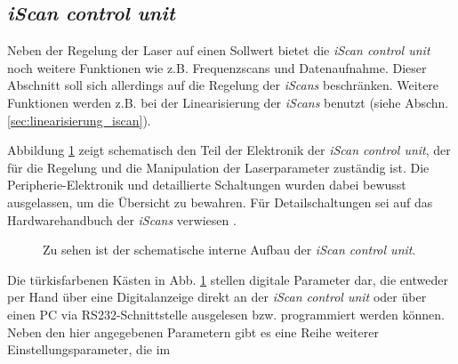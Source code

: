 \subsection{\textit{iScan control unit}}\label{subsec:iscan_control_unit}
Neben der Regelung der Laser auf einen Sollwert bietet die \textit{iScan control
unit} noch weitere Funktionen wie z.B. Frequenzscans und Datenaufnahme. Dieser
Abschnitt soll sich allerdings auf die Regelung der \textit{iScans} beschränken.
Weitere Funktionen werden z.B. bei der Linearisierung der \textit{iScans}
benutzt (siehe Abschn.
\ref{sec:linearisierung_iscan}).\par
Abbildung \ref{fig:iscan_control_unit_regelelektronik} zeigt schematisch den
Teil der Elektronik der \textit{iScan control unit}, der für die Regelung und
die Manipulation der Laserparameter zuständig ist. Die Peripherie-Elektronik und
detaillierte Schaltungen wurden dabei bewusst ausgelassen, um die Übersicht zu
bewahren. Für Detailschaltungen sei auf das Hardwarehandbuch der \textit{iScans}
verwiesen \cite{iscan_hardware_guide}.\par
\begin{figure}[h]
 	\centering
	\caption[Interner Aufbau der \textit{iScan control unit},
	schematisch]{Zu sehen ist der schematische interne Aufbau der \textit{iScan
	control unit}.}\label{fig:iscan_control_unit_regelelektronik}
\end{figure}
Die türkisfarbenen Kästen in Abb. \ref{fig:iscan_control_unit_regelelektronik}
stellen digitale Parameter dar, die entweder per Hand über eine Digitalanzeige
direkt an der \textit{iScan control unit} oder über einen PC via
RS232-Schnittstelle ausgelesen bzw. programmiert werden können. Neben den hier angegebenen
Parametern gibt es eine Reihe weiterer Einstellungsparameter, die im
